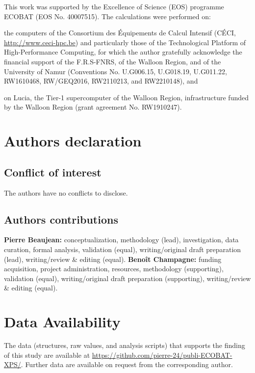 \documentclass[%
aip,
amsmath,amssymb,
preprint,%
jcp,
showkeys,
]{revtex4-2}
\begin{document}
\begin{acknowledgements}
	This work was supported by the Excellence of Science (EOS) programme  ECOBAT (EOS No. 40007515). 
	The calculations were performed on: \begin{inparaenum}[(i)]
	\item the computers of the Consortium des \'{E}quipements de Calcul Intensif (C\'{E}CI, \url{http://www.ceci-hpc.be}) and particularly those of the Technological Platform of High-Performance Computing, for which the author gratefully acknowledge the financial support of the F.R.S-FNRS, of the Walloon Region, and of the University of Namur (Conventions No.  U.G006.15, U.G018.19, U.G011.22, RW1610468, RW/GEQ2016, RW2110213, and RW2210148), and
	\item on Lucia, the Tier-1 supercomputer of the Walloon Region, infrastructure funded by the Walloon Region (grant agreement No. RW1910247).
	\end{inparaenum} 
\end{acknowledgements}

\section*{Authors declaration}

\subsection*{Conflict of interest}

The authors have no conflicts to disclose.

\subsection*{Authors contributions}

\textbf{Pierre Beaujean:} conceptualization, methodology (lead), investigation, data curation, formal analysis,  validation (equal), writing/original draft preparation (lead), writing/review \& editing (equal). \textbf{Benoît Champagne:} funding acquisition, project administration, resources, methodology (supporting), validation (equal), writing/original draft preparation (supporting), writing/review \& editing (equal).

\section*{Data Availability}

The data (structures, raw values, and analysis scripts) that supports the finding of this study are available at \url{https://github.com/pierre-24/publi-ECOBAT-XPS/}.
Further data are available on request from the corresponding author.



	
\end{document}
